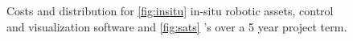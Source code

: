 \documentclass[12pt]{article}
\begin{document}
\begin{figure}[!t]
  \centering
  \caption{Costs and distribution for \ref{fig:insitu} in-situ robotic
    assets, control and visualization software and \ref{fig:sats}
    \smle's over a 5 year project term.}
  \label{fig:costs}
  \vspace{-0.5cm}
\end{figure}
\end{document}
